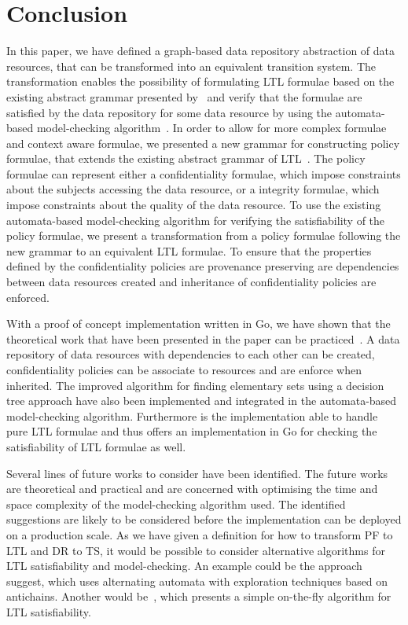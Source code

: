 \section{Conclusion}
In this paper, we have defined a graph-based data repository abstraction of data resources, that can be transformed into an equivalent transition system. The transformation enables the possibility of formulating LTL formulae based on the existing abstract grammar presented by~\cite{baier2008principles} and verify that the formulae are satisfied by the data repository for some data resource by using the automata-based model-checking algorithm~\cite{baier2008principles}. In order to allow for more complex formulae and context aware formulae, we presented a new grammar for constructing policy formulae, that extends the existing abstract grammar of LTL~\cite{baier2008principles}. The policy formulae can represent either a confidentiality formulae, which impose constraints about the subjects accessing the data resource, or a integrity formulae, which impose constraints about the quality of the data resource. To use the existing automata-based model-checking algorithm for verifying the satisfiability of the policy formulae, we present a transformation from a policy formulae following the new grammar to an equivalent LTL formulae. To ensure that the properties defined by the confidentiality policies are provenance preserving are dependencies between data resources created and inheritance of confidentiality policies are enforced.

With a proof of concept implementation written in Go, we have shown that the theoretical work that have been presented in the paper can be practiced~\cite{}. A data repository of data resources with dependencies to each other can be created, confidentiality policies can be associate to resources and are enforce when inherited. The improved algorithm for finding elementary sets using a decision tree approach have also been implemented and integrated in the automata-based model-checking algorithm. Furthermore is the implementation able to handle pure LTL formulae and thus offers an implementation in Go for checking the satisfiability of LTL formulae as well.



Several lines of future works to consider have been identified. The future works are theoretical and practical and are concerned with optimising the time and space complexity of the model-checking algorithm used. The identified suggestions are likely to be considered before the implementation can be deployed on a production scale. As we have given a definition for how to transform PF to LTL and DR to TS, it would be possible to consider alternative algorithms for LTL satisfiability and model-checking. An example could be the approach~\cite{de2008antichains} suggest, which uses alternating automata  with exploration techniques based on antichains. Another would be~\cite{gerth1995simple}, which presents a simple on-the-fly algorithm for LTL satisfiability.
